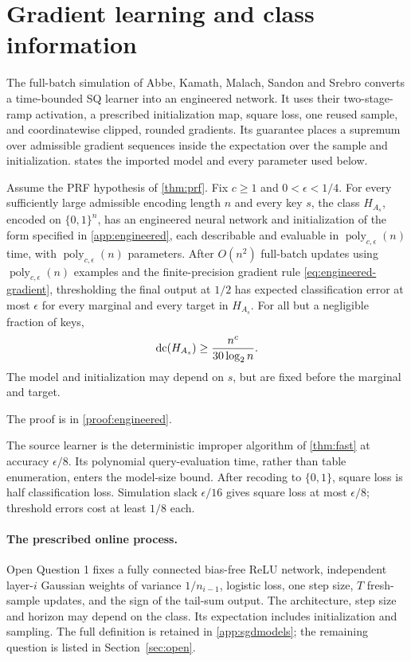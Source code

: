 \section{Gradient learning and class information}\label{sec:resources}\label{sec:secret}
The full-batch simulation of Abbe, Kamath, Malach, Sandon and Srebro \citep[Theorem~3d]{AKMSS21} converts a time-bounded SQ learner into an engineered network. It uses their two-stage-ramp activation, a prescribed initialization map, square loss, one reused sample, and coordinatewise clipped, rounded gradients. Its guarantee places a supremum over admissible gradient sequences inside the expectation over the sample and initialization.  states the imported model and every parameter used below.
\begin{corollary}\label{cor:engineered}
Assume the PRF hypothesis of \cref{thm:prf}. Fix $c\ge1$ and $0<\epsilon<1/4$. For every sufficiently large admissible encoding length $n$ and every key $s$, the class $H_{A_s}$, encoded on $\{0,1\}^n$, has an engineered neural network and initialization of the form specified in \cref{app:engineered}, each describable and evaluable in $\operatorname{poly}_{c,\epsilon}(n)$ time, with $\operatorname{poly}_{c,\epsilon}(n)$ parameters. After $O(n^2)$ full-batch updates using $\operatorname{poly}_{c,\epsilon}(n)$ examples and the finite-precision gradient rule \eqref{eq:engineered-gradient}, thresholding the final output at $1/2$ has expected classification error at most $\epsilon$ for every marginal and every target in $H_{A_s}$. For all but a negligible fraction of keys,
\[
 \operatorname{dc}(H_{A_s})\ge\frac{n^c}{30\log_2 n}.
\]
The model and initialization may depend on $s$, but are fixed before the marginal and target.
\end{corollary}
\noindent The proof is in \cref{proof:engineered}.

The source learner is the deterministic improper algorithm of \cref{thm:fast} at accuracy $\epsilon/8$. Its polynomial query-evaluation time, rather than table enumeration, enters the model-size bound. After recoding to $\{0,1\}$, square loss is half classification loss. Simulation slack $\epsilon/16$ gives square loss at most $\epsilon/8$; threshold errors cost at least $1/8$ each.

\paragraph{The prescribed online process.}
Open Question 1 fixes a fully connected bias-free ReLU network, independent layer-$i$ Gaussian weights of variance $1/n_{i-1}$, logistic loss, one step size, $T$ fresh-sample updates, and the sign of the tail-sum output. The architecture, step size and horizon may depend on the class. Its expectation includes initialization and sampling. The full definition is retained in \cref{app:sgdmodels}; the remaining question is listed in Section~\ref{sec:open}.

